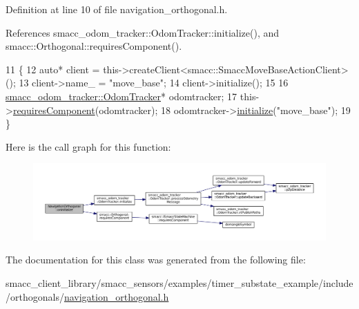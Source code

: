 Definition at line 10 of file navigation\+\_\+orthogonal.\+h.



References smacc\+\_\+odom\+\_\+tracker\+::\+Odom\+Tracker\+::initialize(), and smacc\+::\+Orthogonal\+::requires\+Component().


\begin{DoxyCode}
11     \{
12         \textcolor{keyword}{auto}* client = this->createClient<smacc::SmaccMoveBaseActionClient>();       
13         client->name\_ = \textcolor{stringliteral}{"move\_base"};
14         client->initialize();
15 
16         \hyperlink{classsmacc__odom__tracker_1_1OdomTracker}{smacc\_odom\_tracker::OdomTracker}* odomtracker;
17         this->\hyperlink{classsmacc_1_1Orthogonal_a098b5be0f89d0911afc44c10b756ef2a}{requiresComponent}(odomtracker);
18         odomtracker->\hyperlink{classsmacc__odom__tracker_1_1OdomTracker_a4b3ff3f659474cb7bdd6b4b54dcc0a53}{initialize}(\textcolor{stringliteral}{"move\_base"});
19     \}
\end{DoxyCode}


Here is the call graph for this function\+:
\nopagebreak
\begin{figure}[H]
\begin{center}
\leavevmode
\includegraphics[width=350pt]{classNavigationOrthogonal_a1d9e825be23c75d7baf594a8c1f0fb74_cgraph}
\end{center}
\end{figure}




The documentation for this class was generated from the following file\+:\begin{DoxyCompactItemize}
\item 
smacc\+\_\+client\+\_\+library/smacc\+\_\+sensors/examples/timer\+\_\+substate\+\_\+example/include/orthogonals/\hyperlink{smacc__client__library_2smacc__sensors_2examples_2timer__substate__example_2include_2orthogonals_2navigation__orthogonal_8h}{navigation\+\_\+orthogonal.\+h}\end{DoxyCompactItemize}
